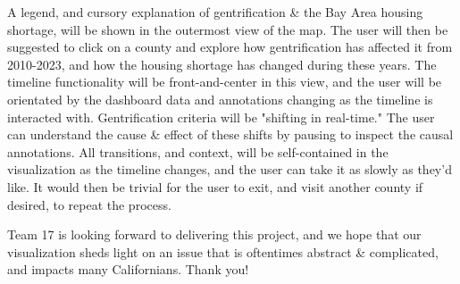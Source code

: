 \documentclass{article}
\begin{document}
A legend, and cursory explanation of gentrification \& the Bay Area housing shortage, will be shown in the outermost view of the map. The user will then be suggested to click on a county and explore how gentrification has affected it from 2010-2023, and how the housing shortage has changed during these years. The timeline functionality will be front-and-center in this view, and the user will be orientated by the dashboard data and annotations changing as the timeline is interacted with. Gentrification criteria will be "shifting in real-time." The user can understand the cause \& effect of these shifts by pausing to inspect the causal annotations. All transitions, and context, will be self-contained in the visualization as the timeline changes, and the user can take it as slowly as they'd like. It would then be trivial for the user to exit, and visit another county if desired, to repeat the process.

Team 17 is looking forward to delivering this project, and we hope that our visualization sheds light on an issue that is oftentimes abstract \& complicated, and impacts many Californians. Thank you!

\nocite{*}


\end{document}
